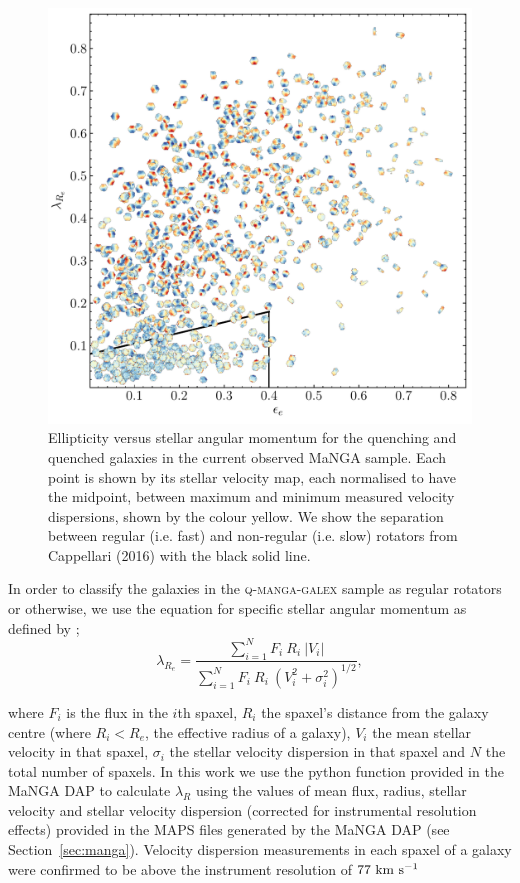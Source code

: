 \documentclass[useAMS,usenatbib]{mn2e}
\begin{document}
\begin{figure}
\centering
\includegraphics[width=\textwidth]{../figures/nonSF_FR_SR_sample_orig_cmap_vel_maps.pdf}
\caption{Ellipticity versus stellar angular momentum for the quenching and quenched galaxies in the current observed MaNGA sample. Each point is shown by its stellar velocity map, each normalised to have the midpoint, between maximum and minimum measured velocity dispersions, shown by the colour yellow. We show the separation between regular (i.e. fast) and non-regular (i.e. slow) rotators from Cappellari (2016) with the black solid line.}
\label{fig:evsl}
\end{figure}


In order to classify the galaxies in the \textsc{q-manga-galex} sample as regular rotators or otherwise, we use the equation for specific stellar angular momentum as defined by \cite{emsellem07, emsellem11};
\begin{equation}
\lambda_{R_{e}} = \frac{\sum_{i=1}^{N} F_i\ R_i\ |V_i|}{\sum_{i=1}^{N} F_i\ R_i\ (V_i^2 + \sigma_i^2)^{1/2}},
\end{equation}	

where $F_i$ is the flux in the $i$th spaxel, $R_i$ the spaxel's distance from the galaxy centre (where $R_i < R_e$, the effective radius of a galaxy), $V_i$ the mean stellar velocity in that spaxel, $\sigma_i$ the stellar velocity dispersion in that spaxel and $N$ the total number of spaxels. In this work we use the python function provided in the MaNGA DAP to calculate $\lambda_R$ using the values of mean flux, radius, stellar velocity and stellar velocity dispersion (corrected for instrumental resolution effects) provided in the MAPS files generated by the MaNGA DAP (see Section~\ref{sec:manga}). Velocity dispersion measurements in each spaxel of a galaxy were confirmed to be above the instrument resolution of $77~\rm{km}~\rm{s}^{-1}$
\end{document}
